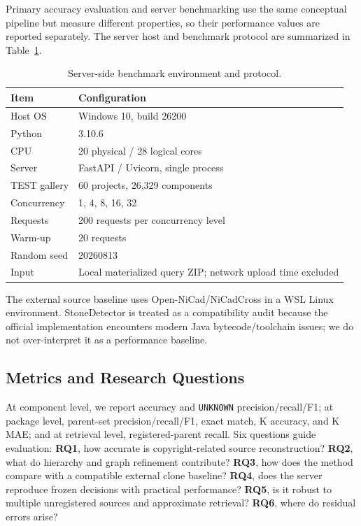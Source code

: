 \documentclass[runningheads]{llncs}
\begin{document}
Primary accuracy evaluation and server benchmarking use the same conceptual pipeline but measure different properties, so their performance values are reported separately. The server host and benchmark protocol are summarized in Table~\ref{tab:environment}.

\begin{table}[!htbp]
\centering
\caption{Server-side benchmark environment and protocol.}
\label{tab:environment}
\scriptsize
\begin{tabular}{p{4.1cm}p{7.1cm}}
\toprule
Item & Configuration\\
\midrule
Host OS & Windows 10, build 26200\\
Python & 3.10.6\\
CPU & 20 physical / 28 logical cores\\
Server & FastAPI / Uvicorn, single process\\
TEST gallery & 60 projects, 26,329 components\\
Concurrency & 1, 4, 8, 16, 32\\
Requests & 200 requests per concurrency level\\
Warm-up & 20 requests\\
Random seed & 20260813\\
Input & Local materialized query ZIP; network upload time excluded\\
\bottomrule
\end{tabular}
\end{table}

The external source baseline uses Open-NiCad/NiCadCross in a WSL Linux environment. StoneDetector is treated as a compatibility audit because the official implementation encounters modern Java bytecode/toolchain issues; we do not over-interpret it as a performance baseline.

\subsection{Metrics and Research Questions}

At component level, we report accuracy and \texttt{UNKNOWN} precision/recall/F1; at package level, parent-set precision/recall/F1, exact match, K accuracy, and K MAE; and at retrieval level, registered-parent recall. Six questions guide evaluation: \textbf{RQ1}, how accurate is copyright-related source reconstruction? \textbf{RQ2}, what do hierarchy and graph refinement contribute? \textbf{RQ3}, how does the method compare with a compatible external clone baseline? \textbf{RQ4}, does the server reproduce frozen decisions with practical performance? \textbf{RQ5}, is it robust to multiple unregistered sources and approximate retrieval? \textbf{RQ6}, where do residual errors arise?
\end{document}
